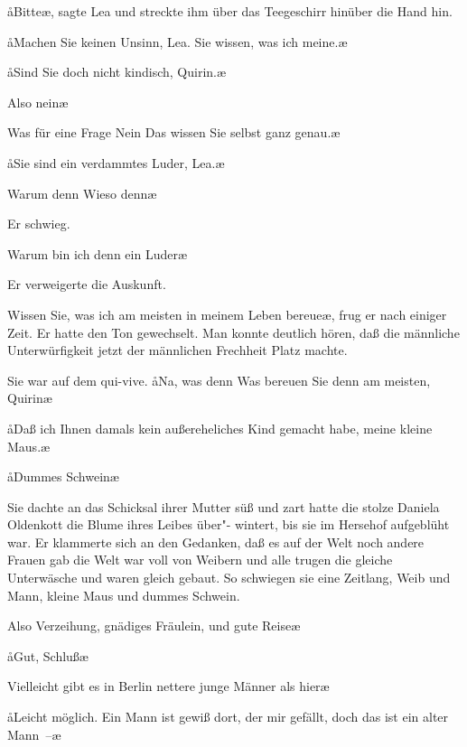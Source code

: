 \aa{}Bitte\ae{}, sagte Lea und streckte ihm über das Teegeschirr hinüber
die Hand hin.

\aa{}Machen Sie keinen Unsinn, Lea. Sie wissen, was ich
meine.\ae{}

\aa{}Sind Sie doch nicht kindisch, Quirin.\ae{}

\aanah{}Also nein\frag{}\ae{}

\aanah{}Was für eine Frage\ausr{} Nein\ausr{} Das wissen Sie selbst ganz
genau.\ae{}

\aa{}Sie sind ein verdammtes Luder, Lea.\ae{}

\aanah{}Warum denn\frag{} Wieso denn\frag{}\ae{}

Er schwieg.

\aanah{}Warum bin ich denn ein Luder\frag{}\ae{}

Er verweigerte die Auskunft.

\aanah{}Wissen Sie, was ich am meisten in meinem Leben bereue\ae{},
frug er nach einiger Zeit. Er hatte den Ton gewechselt. Man
konnte deutlich hören, daß die männliche Unterwürfigkeit jetzt
der männlichen Frechheit Platz machte.

Sie war auf dem qui-vive. \aa{}Na, was denn\frag{} Was bereuen
Sie denn am meisten, Quirin\eingriff{eS36-1}{Quirin ] Qurin}\frag{}\ae{}

\aa{}Daß ich Ihnen damals kein außereheliches Kind gemacht
habe, meine kleine Maus.\ae{}

\aa{}Dummes Schwein\ausr{}\ae{}

Sie dachte an das Schicksal ihrer Mutter\dopp{} süß und zart hatte
die stolze Daniela Oldenkott die Blume ihres Leibes über"-%
wintert, bis sie im Hersehof aufgeblüht war. Er klammerte
sich an den Gedanken, daß es auf der Welt noch andere Frauen
gab\dopp{} die Welt war voll von Weibern und alle trugen die gleiche
Unterwäsche und waren gleich gebaut. So schwiegen sie eine
Zeitlang, Weib und Mann, kleine Maus und dummes
Schwein.

\aanah{}Also Verzeihung, gnädiges Fräulein, und gute Reise\ausr{}\ae{}

\aa{}Gut, Schluß\ausr{}\ae{}

\aanah{}Vielleicht gibt es in Berlin nettere junge Männer als hier\frag{}\ae{}

\aa{}Leicht möglich. Ein Mann ist gewiß dort, der mir gefällt,
doch das ist ein alter Mann~--\ae{}

